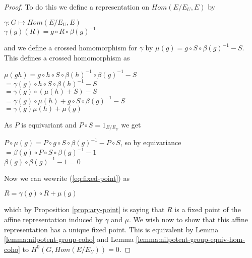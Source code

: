 \begin{proof}
    To do this we define a representation on $Hom(E/E_U, E)$ by
    \begin{center}
        $\gamma : G \mapsto Hom(E/E_U, E)$\\
        $\gamma(g)(R) = g\circ R \circ \beta(g)^{-1}$
    \end{center}
    and we define a crossed homomorphism for $\gamma$ by $\mu(g) = g\circ S \circ \beta(g)^{-1} - S$. This
    defines a crossed homomorphism  as
    \begin{center}
        $\mu(gh) = g \circ h\circ S \circ \beta(h)^{-1}\circ \beta(g)^{-1} -S$\\
        $ = \gamma(g)\circ h\circ S \circ \beta(h)^{-1} - S$\\
        $ = \gamma(g)\circ (\mu(h) + S) - S$\\
        $ = \gamma(g)\circ \mu(h) + g\circ S\circ \beta(g)^{-1} -S$\\
        $ = \gamma(g)\mu(h) + \mu(g)$
    \end{center}
    As $P$ is equivariant and $P \circ S = 1_{E/E_U}$ we get
    \begin{center}
        $P \circ \mu(g) =  P \circ g \circ S \circ \beta(g)^{-1} - P \circ S$, so by equivariance\\
        $ =  \beta(g) \circ P  \circ S \circ \beta(g)^{-1} - 1$\\
        $ \beta(g) \circ \beta(g)^{-1} - 1 = 0$
    \end{center}
    Now we can wewrite (\ref{eq:fixed-point}) as
    \begin{center}
        $R = \gamma(g)\circ R + \mu(g)$
    \end{center}
    which by Proposition \ref{prop:ary-point} is saying that $R$ is a fixed point of the affine representation
    induced by $\gamma$ and $\mu$. We wish now to show that this affine representation has a unique fixed point.
    This is equivalent by Lemma \ref{lemma:nilpotent-group-coho} and Lemma \ref{lemma:nilpotent-group-equiv-hom-coho}
    to $H^{0}(G, Hom(E/E_U)) = 0$.


\end{proof}
